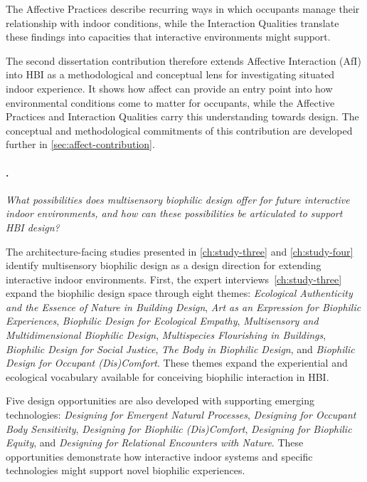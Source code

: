 The Affective Practices describe recurring ways in which occupants manage their relationship with indoor conditions, while the Interaction Qualities translate these findings into capacities that interactive environments might support.

The second dissertation contribution therefore extends Affective Interaction (AfI) into HBI as a methodological and conceptual lens for investigating situated indoor experience. It shows how affect can provide an entry point into how environmental conditions come to matter for occupants, while the Affective Practices and Interaction Qualities carry this understanding towards design. The conceptual and methodological commitments of this contribution are developed further in \autoref{sec:affect-contribution}.

\clearpage

\paragraph{.}

\emph{What possibilities does multisensory biophilic design offer for future interactive indoor environments, and how can these possibilities be articulated to support HBI design?}

The architecture-facing studies presented in \autoref{ch:study-three} and \autoref{ch:study-four} identify multisensory biophilic design as a design direction for extending interactive indoor environments. First, the expert interviews~\autoref{ch:study-three} expand the biophilic design space through eight themes: \textit{Ecological Authenticity and the Essence of Nature in Building Design}, \textit{Art as an Expression for Biophilic Experiences}, \textit{Biophilic Design for Ecological Empathy}, \textit{Multisensory and Multidimensional Biophilic Design}, \textit{Multispecies Flourishing in Buildings}, \textit{Biophilic Design for Social Justice}, \textit{The Body in Biophilic Design}, and \textit{Biophilic Design for Occupant (Dis)Comfort}. These themes expand the experiential and ecological vocabulary available for conceiving biophilic interaction in HBI.

Five design opportunities are also developed with supporting emerging technologies: \textit{Designing for Emergent Natural Processes}, \textit{Designing for Occupant Body Sensitivity}, \textit{Designing for Biophilic (Dis)Comfort}, \textit{Designing for Biophilic Equity}, and \textit{Designing for Relational Encounters with Nature}. These opportunities demonstrate how interactive indoor systems and specific technologies might support novel biophilic experiences.

